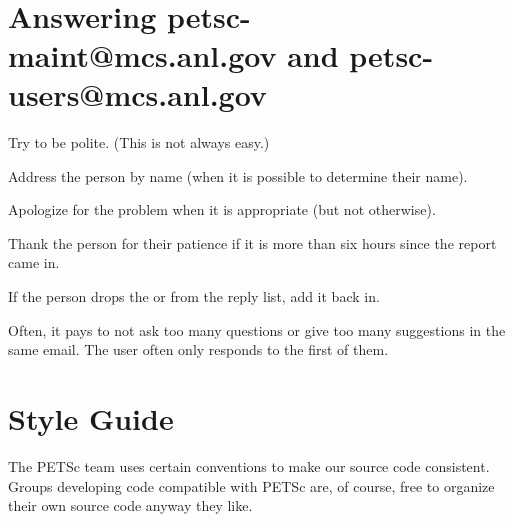 \newpage
\hbox{ }
\newpage

\tableofcontents

\pagestyle{fancy}
\chapter{Answering petsc-maint@mcs.anl.gov and petsc-users@mcs.anl.gov}

\begin{tightitemize}
\item Try to be polite. (This is not always easy.)
\item Address the person by name (when it is possible to determine their name).
\item Apologize for the problem when it is appropriate (but not otherwise).
\item Thank the person for their patience if it is more than six hours since the report came in.
\item If the person drops the  or  from the reply list, add it back in.
\item Often, it pays to not ask too many questions or give too many suggestions in the same email. The user often only responds to the first of them.
\end{tightitemize}

\chapter{Style Guide}\label{chapter:styleguide}

The PETSc team uses certain conventions to make our source code consistent. Groups
developing code compatible with PETSc are, of course, free to organize their
own source code anyway they like.


